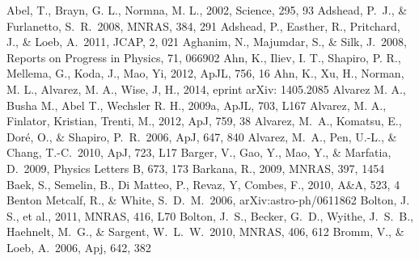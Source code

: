 \begin{thebibliography}{99}
\begin{multicols}{2}{\footnotesize
 Abel, T., Brayn, G. L., Normna, M. L., 2002, Science, 295, 93
 Adshead, P.~J., \& Furlanetto, S.~R.\ 2008, MNRAS, 384, 291 
 Adshead, P., Easther, R., Pritchard, J., \& Loeb, A.\ 2011, JCAP, 2, 021 
 Aghanim, N., Majumdar, S., \& Silk, J.\ 2008, Reports on Progress in Physics, 71, 066902 
 Ahn, K., Iliev, I. T., Shapiro, P. R., Mellema, G., Koda, J., Mao, Yi, 2012, ApJL, 756, 16
 Ahn, K., Xu, H., Norman, M. L., Alvarez, M. A., Wise, J, H., 2014, eprint arXiv: 1405.2085
Alvarez M. A., Busha M., Abel T., Wechsler R. H., 2009a, ApJL, 703, L167
 Alvarez, M. A., Finlator, Kristian, Trenti, M., 2012, ApJ, 759, 38
 Alvarez, M.~A., Komatsu, E., Dor{\'e}, O., \& Shapiro, P.~R.\ 2006, ApJ, 647, 840 
 Alvarez, M.~A., Pen, U.-L., \& Chang, T.-C.\ 2010, ApJ, 723, L17 
 Barger, V., Gao, Y., Mao, Y., \& Marfatia, D.\ 2009, Physics Letters B, 673, 173 
 Barkana, R., 2009, MNRAS, 397, 1454
 Baek, S., Semelin, B., Di Matteo, P., Revaz, Y, Combes, F., 2010, A\&A, 523, 4
 Benton Metcalf, R., \& White, S.~D.~M.\ 2006, arXiv:astro-ph/0611862 
 Bolton, J. S., et al., 2011, MNRAS, 416, L70
 Bolton, J.~S., Becker, G.~D., Wyithe, J.~S.~B., Haehnelt, M.~G., \& Sargent, W.~L.~W.\ 2010, MNRAS, 406, 612 
 Bromm, V., \& Loeb, A.\ 2006, Apj, 642, 382 
}
\end{multicols}
\end{thebibliography}
